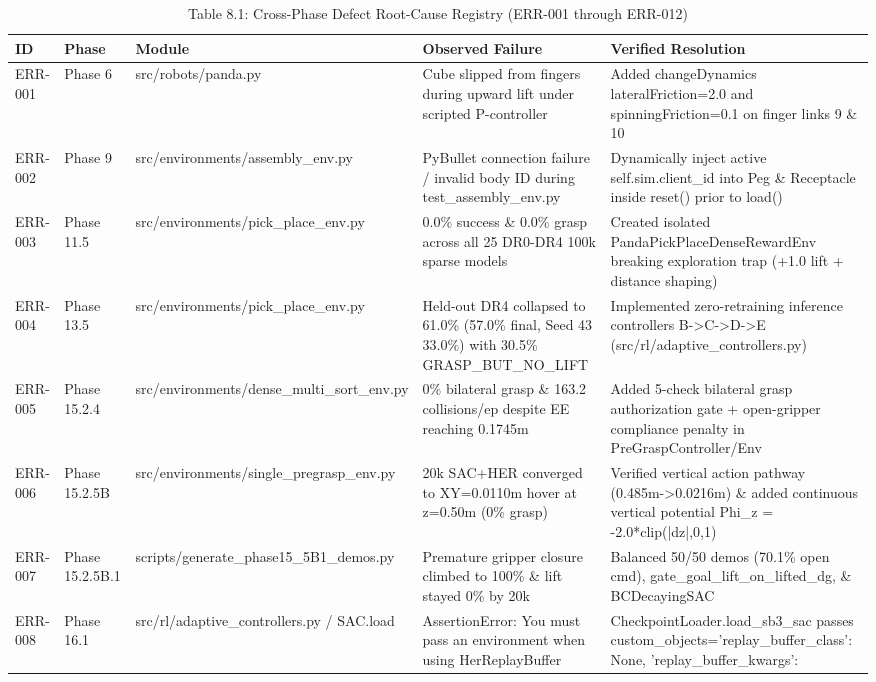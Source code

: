 \begin{longtable}{l l l l l}\caption{Table 8.1: Cross-Phase Defect Root-Cause Registry (ERR-001 through ERR-012)}\\\toprule
ID & Phase & Module & Observed Failure & Verified Resolution \\ \midrule \endhead
ERR-001 & Phase 6 & src/robots/panda.py & Cube slipped from fingers during upward lift under scripted P-controller & Added changeDynamics lateralFriction=2.0 and spinningFriction=0.1 on finger links 9 \& 10 \\
ERR-002 & Phase 9 & src/environments/assembly\_env.py & PyBullet connection failure / invalid body ID during test\_assembly\_env.py & Dynamically inject active self.sim.client\_id into Peg \& Receptacle inside reset() prior to load() \\
ERR-003 & Phase 11.5 & src/environments/pick\_place\_env.py & 0.0\% success \& 0.0\% grasp across all 25 DR0-DR4 100k sparse models & Created isolated PandaPickPlaceDenseRewardEnv breaking exploration trap (+1.0 lift + distance shaping) \\
ERR-004 & Phase 13.5 & src/environments/pick\_place\_env.py & Held-out DR4 collapsed to 61.0\% (57.0\% final, Seed 43 33.0\%) with 30.5\% GRASP\_BUT\_NO\_LIFT & Implemented zero-retraining inference controllers B->C->D->E (src/rl/adaptive\_controllers.py) \\
ERR-005 & Phase 15.2.4 & src/environments/dense\_multi\_sort\_env.py & 0\% bilateral grasp \& 163.2 collisions/ep despite EE reaching 0.1745m & Added 5-check bilateral grasp authorization gate + open-gripper compliance penalty in PreGraspController/Env \\
ERR-006 & Phase 15.2.5B & src/environments/single\_pregrasp\_env.py & 20k SAC+HER converged to XY=0.0110m hover at z=0.50m (0\% grasp) & Verified vertical action pathway (0.485m->0.0216m) \& added continuous vertical potential Phi\_z = -2.0*clip(|dz|,0,1) \\
ERR-007 & Phase 15.2.5B.1 & scripts/generate\_phase15\_5B1\_demos.py & Premature gripper closure climbed to 100\% \& lift stayed 0\% by 20k & Balanced 50/50 demos (70.1\% open cmd), gate\_goal\_lift\_on\_lifted\_dg, \& BCDecayingSAC \\
ERR-008 & Phase 16.1 & src/rl/adaptive\_controllers.py / SAC.load & AssertionError: You must pass an environment when using HerReplayBuffer & CheckpointLoader.load\_sb3\_sac passes custom\_objects={'replay\_buffer\_class': None, 'replay\_buffer\_kwargs': {}} \\

\end{longtable}
